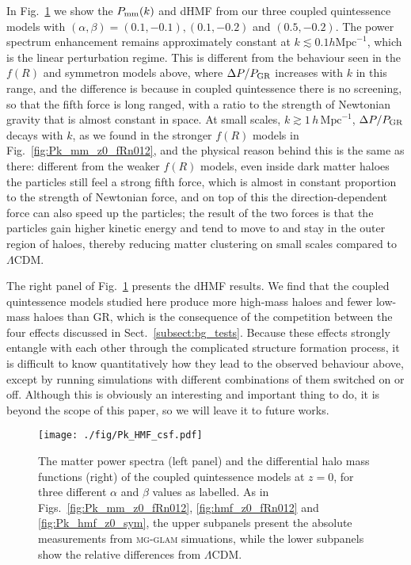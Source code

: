 In Fig.~\ref{fig:Pk_HMF_csf} we show the $P_{\rm mm}(k)$ and dHMF from our three coupled quintessence models with $(\alpha, \beta) = (0.1, -0.1), (0.1, -0.2)$ and $(0.5, -0.2)$. 
The power spectrum enhancement remains approximately constant at $k\lesssim0.1h\mathrm{Mpc}^{-1}$, which is the linear perturbation regime. This is different from the behaviour seen in the $f(R)$ and symmetron models above, where $\Delta P/P_{\rm GR}$ increases with $k$ in this range, and the difference is because in coupled quintessence there is no screening, so that the fifth force is long ranged, with a ratio to the strength of Newtonian gravity that is almost constant in space. At small scales, $k \gtrsim 1 \, h \, \mathrm{Mpc}^{-1}$, $\Delta P/P_{\rm GR}$ decays with $k$, as we found in the stronger $f(R)$ models in Fig.~\ref{fig:Pk_mm_z0_fRn012}, and the physical reason behind this is the same as there: different from the weaker $f(R)$ models, even inside dark matter haloes the particles still feel a strong fifth force, which is almost in constant proportion to the strength of Newtonian force, and on top of this the direction-dependent force can also speed up the particles; the result of the two forces is that the particles gain higher kinetic energy and tend to move to and stay in the outer region of haloes, thereby reducing matter clustering on small scales compared to $\Lambda$CDM.


The right panel of Fig.~\ref{fig:Pk_HMF_csf} presents the dHMF results. 
We find that the coupled quintessence models studied here produce more high-mass haloes and fewer low-mass haloes than \ac{GR}, which is the consequence of the competition between the four effects discussed in Sect.~\ref{subsect:bg_tests}. Because these effects strongly entangle with each other through the complicated structure formation process, it is difficult to know quantitatively how they lead to the observed behaviour above, except by running simulations with different combinations of them switched on or off. 
Although this is obviously an interesting and important thing to do, it is beyond the scope of this paper, so we will leave it to future works.


\begin{figure}
    \centering 
    \texttt{[image: ./fig/Pk\_HMF\_csf.pdf]}
    \caption{The matter power spectra (left panel) and the differential halo mass functions (right) of the coupled quintessence models at $z=0$, for three different $\alpha$ and $\beta$ values as labelled. As in Figs.~\ref{fig:Pk_mm_z0_fRn012}, \ref{fig:hmf_z0_fRn012} and \ref{fig:Pk_hmf_z0_sym}, the upper subpanels present the absolute measurements from \textsc{mg-glam} simuations, while the lower subpanels show the relative differences from $\Lambda$CDM.
    }
    \label{fig:Pk_HMF_csf}
\end{figure}


